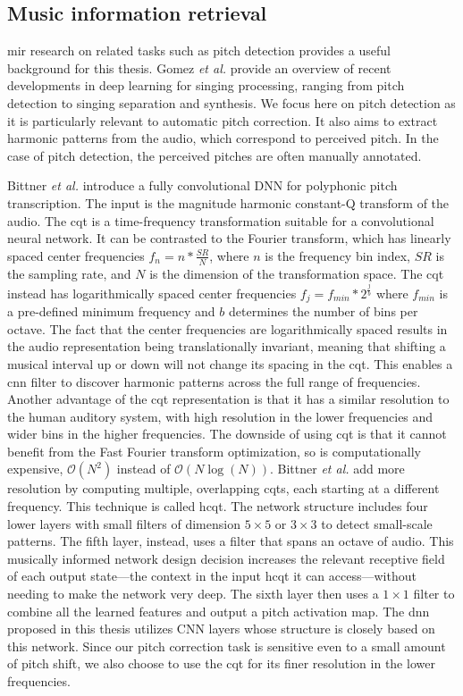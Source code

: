\subsection{Music information retrieval}
\gls{mir} research on related tasks such as pitch detection provides a useful background for this thesis. Gomez {\it et al.}\cite{gomez2018deep} provide an overview of recent developments in deep learning for singing processing, ranging from pitch detection to singing separation and synthesis. We focus here on pitch detection as it is particularly relevant to automatic pitch correction. It also aims to extract harmonic patterns from the audio, which correspond to perceived pitch. In the case of pitch detection, the perceived pitches are often manually annotated. 

Bittner \textit{et al.} introduce a fully convolutional DNN for polyphonic pitch transcription. The input is the magnitude harmonic constant-Q transform of the audio. The \gls{cqt} is a time-frequency transformation suitable for a convolutional neural network. It can be contrasted to the Fourier transform, which has linearly spaced center frequencies $f_n = n * \frac{SR}{N}$, where $n$ is the frequency bin index, $SR$ is the sampling rate, and $N$ is the dimension of the transformation space. The \gls{cqt} instead has logarithmically spaced center frequencies $f_j = f_{min} * 2^{\frac{j}{b}}$ where $f_{min}$ is a pre-defined minimum frequency and $b$ determines the number of bins per octave. The fact that the center frequencies are logarithmically spaced results in the audio representation being translationally invariant, meaning that shifting a musical interval up or down will not change its spacing in the \gls{cqt}. This enables a \gls{cnn} filter to discover harmonic patterns across the full range of frequencies. Another advantage of the \gls{cqt} representation is that it has a similar resolution to the human auditory system, with high resolution in the lower frequencies and wider bins in the higher frequencies. The downside of using \gls{cqt} is that it cannot benefit from the Fast Fourier transform optimization, so is computationally expensive, $\mathcal{O}(N^2)$ instead of $\mathcal{O}(N \log (N))$. Bittner \textit{et al.} add more resolution by computing multiple, overlapping \gls{cqt}s, each starting at a different frequency. This technique is called \gls{hcqt}. The network structure includes four lower layers with small filters of dimension $5 \times 5$ or $3 \times 3$ to detect small-scale patterns. The fifth layer, instead, uses a filter that spans an octave of audio. This musically informed network design decision increases the relevant receptive field of each output state---the context in the input \gls{hcqt} it can access---without needing to make the network very deep. The sixth layer then uses a $1 \times 1$ filter to combine all the learned features and output a pitch activation map. \cite{bittner2017deep} The \gls{dnn} proposed in this thesis utilizes CNN layers whose structure is closely based on this network. Since our pitch correction task is sensitive even to a small amount of pitch shift, we also choose to use the \gls{cqt} for its finer resolution in the lower frequencies. 

